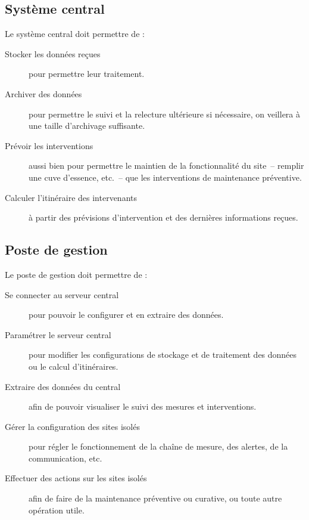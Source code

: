 \documentclass[a4paper, 11pt]{article}
\begin{document}
\subsection{Système central}
Le système central doit permettre de :
\begin{description}
	\item [Stocker les données reçues] pour permettre leur traitement.
	\item [Archiver des données] pour permettre le suivi et la relecture ultérieure si nécessaire, on veillera à une taille d'archivage suffisante.
	\item [Prévoir les interventions] aussi bien pour permettre le maintien de la fonctionnalité du site~-- remplir une cuve d'essence, etc.~-- que les interventions de maintenance préventive.
	\item [Calculer l'itinéraire des intervenants] à partir des prévisions d'intervention et des dernières informations reçues.  
\end{description}

\subsection{Poste de gestion}
Le poste de gestion doit permettre de :
\begin{description}
	\item [Se connecter au serveur central] pour pouvoir le configurer et en extraire des données.
	\item [Paramétrer le serveur central] pour modifier les configurations de stockage et de traitement des données ou le calcul d'itinéraires.
	\item [Extraire des données du central] afin de pouvoir visualiser le suivi des mesures et interventions.
	\item [Gérer la configuration des sites isolés] pour régler le fonctionnement de la chaîne de mesure, des alertes, de la communication, etc.
	\item [Effectuer des actions sur les sites isolés] afin de faire de la maintenance préventive ou curative, ou toute autre opération utile.
\end{description}
\end{document}
